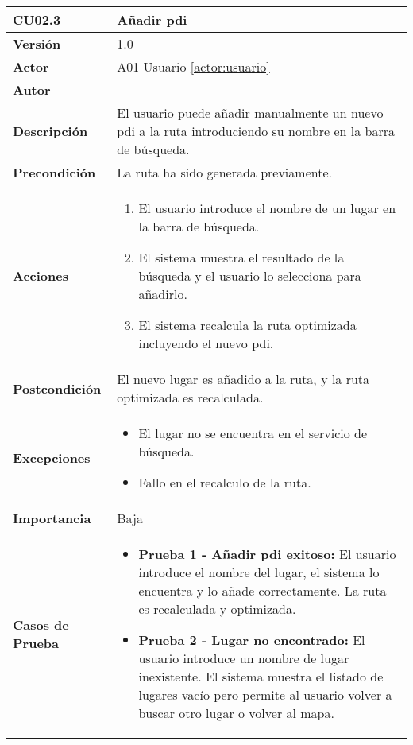 \begin{table}[H]
	\centering
	\begin{tabularx}{\linewidth}{ p{} p{} }
		\toprule
		\textbf{CU02.3}    & \textbf{Añadir \acrfull{pdi}} \\
		\toprule
		\textbf{Versión}              & 1.0    \\
		\textbf{Actor}                & A01 Usuario \ref{actor:usuario} \\
		\textbf{Autor}                & \autor \\
		\textbf{Descripción}          & El usuario puede añadir manualmente un nuevo \acrshort{pdi} a la ruta introduciendo su nombre en la barra de búsqueda. \\
		\textbf{Precondición}         & La ruta ha sido generada previamente. \\
		\textbf{Acciones}             &
		\begin{enumerate}
			\def\labelenumi{\arabic{enumi}.}
			\tightlist
			\item El usuario introduce el nombre de un lugar en la barra de búsqueda.
			\item El sistema muestra el resultado de la búsqueda y el usuario lo selecciona para añadirlo.
			\item El sistema recalcula la ruta optimizada incluyendo el nuevo \acrlong{pdi}.
		\end{enumerate}\\
		\textbf{Postcondición}        & El nuevo lugar es añadido a la ruta, y la ruta optimizada es recalculada. \\
		\textbf{Excepciones}          & 
		\begin{itemize}
			\tightlist
			\item El lugar no se encuentra en el servicio de búsqueda.
			\item Fallo en el recalculo de la ruta.
		\end{itemize}\\
		\textbf{Importancia}          & Baja \\
		\textbf{Casos de Prueba}      &
		\begin{itemize}
			\item \textbf{Prueba 1 - Añadir \acrshort{pdi} exitoso:} El usuario introduce el nombre del lugar, el sistema lo encuentra y lo añade correctamente. La ruta es recalculada y optimizada.
			\vspace{2pt}
			\item \textbf{Prueba 2 - Lugar no encontrado:} El usuario introduce un nombre de lugar inexistente. El sistema muestra el listado de lugares vacío pero permite al usuario volver a buscar otro lugar o volver al mapa.

\end{itemize}
\end{tabularx}
\end{table}
